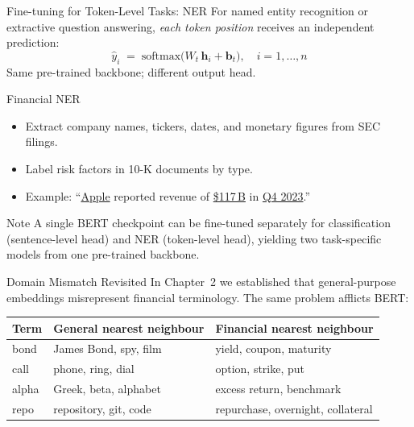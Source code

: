 \documentclass[11pt,aspectratio=169,professionalfonts]{beamer}
\begin{document}
%
%
\begin{frame}{Fine-tuning for Token-Level Tasks: NER}
  For named entity recognition or extractive question answering,
  \emph{each token position} receives an independent prediction:
  \[
    \hat{y}_i \;=\; \mathrm{softmax}\!\bigl(W_t\,\mathbf{h}_i
                                      + \mathbf{b}_t\bigr),
    \quad i = 1,\ldots,n
  \]
  Same pre-trained backbone; different output head.

  \begin{exampleblock}{Financial NER}
    \begin{itemize}
      \item Extract company names, tickers, dates, and monetary
            figures from SEC filings.
      \item Label risk factors in 10-K documents by type.
      \item Example: ``\underline{Apple} reported revenue of
            \underline{\$117\,B} in \underline{Q4 2023}.''
    \end{itemize}
  \end{exampleblock}
  \begin{block}{Note}
    A single BERT checkpoint can be fine-tuned separately for
    classification (sentence-level head) and NER (token-level head),
    yielding two task-specific models from one pre-trained backbone.
  \end{block}
\end{frame}
%
%
\begin{frame}{Domain Mismatch Revisited}
  In Chapter~2 we established that general-purpose embeddings
  misrepresent financial terminology.  The same problem afflicts BERT:

  \begin{center}
  \small
  \renewcommand{\arraystretch}{1.25}
  \begin{tabular}{@{}lll@{}}
    \toprule
    \textbf{Term} & \textbf{General nearest neighbour}
      & \textbf{Financial nearest neighbour}\\
    \midrule
    bond  & James Bond, spy, film    & yield, coupon, maturity\\
    call  & phone, ring, dial        & option, strike, put\\
    alpha & Greek, beta, alphabet    & excess return, benchmark\\
    repo  & repository, git, code    & repurchase, overnight, collateral\\
    \bottomrule
  \end{tabular}
  \end{center}

\end{frame}
\end{document}
